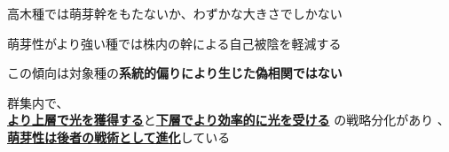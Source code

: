 \documentclass[a0, 36pt, plainboxedsections]{sciposter} %
\begin{document}
\begin{multicols}{2}
\begin{mdframed}[style=conclusion.frame,frametitle={\textbf{\Large{萌芽性は樹高と背反的に進化しており、\\\hspace*{1em}群集の中に多様な萌芽性の種が存在する}}}]
{    \faCaretRight 高木種では萌芽幹をもたないか、わずかな大きさでしかない
    
    \faCaretRight 萌芽性がより強い種では株内の幹による自己被陰を軽減する
    
    \faCaretRight この傾向は対象種の\textbf{系統的偏りにより生じた偽相関ではない}
  }
  \faHandLeft 群集内で、\\\textbf{\underline{より上層で光を獲得する}}と\textbf{\underline{下層でより効率的に光を受ける}} の戦略分化があり
  、\textbf{\underline{萌芽性は後者の戦術として進化}}している
 
\end{mdframed}

\end{multicols}
\begin{mdframed}[style=section.frame]
  \flushleft\LARGE\textbf{\color{white}{方法}}
\end{mdframed}\vspace{-1.2em}
\end{document}
